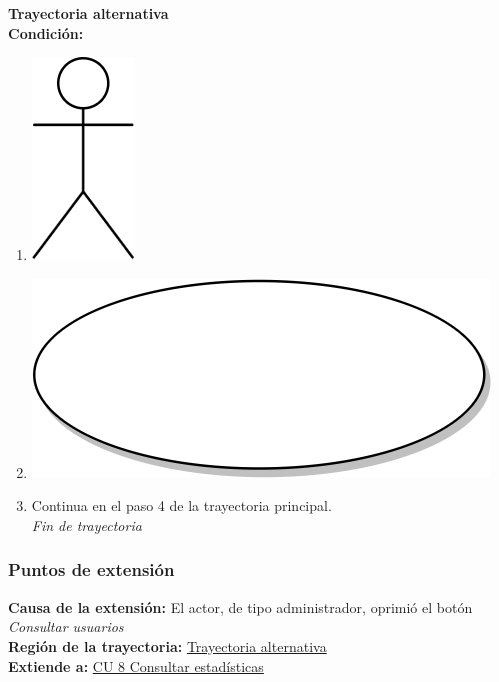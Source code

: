 \textbf{Trayectoria alternativa} \label{cu_ta_} \\
\textbf{Condición:} \\
 \begin{enumerate}[label=\arabic*]
    \item {\includegraphics[scale=.1]{Capitulo3/img/actor.png} }
    \item {\includegraphics[scale=.05]{Capitulo3/img/proceso.png}}
    \item {Continua en el paso 4 de la trayectoria principal.} \\
    \textit{Fin de trayectoria} \\
\end{enumerate}


\subsubsection{Puntos de extensión}
\noindent \textbf{Causa de la extensión:} El actor, de tipo administrador, oprimió el botón \textit{Consultar usuarios} \\
\textbf{Región de la trayectoria:} \hyperref[cu_ta_]{Trayectoria alternativa } \\
\textbf{Extiende a:} \hyperref[cu8]{CU 8 Consultar estadísticas}
